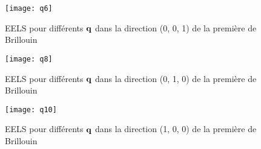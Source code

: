\begin{figure}[!h]\label{fig-q6}
    \centering
    \texttt{[image: q6]}
    \caption{EELS pour différents $\vb{q}$ dans la direction (0, 0, 1) de la première de Brillouin}
\end{figure}

\begin{figure}[!h]\label{fig-q8}
    \centering
    \texttt{[image: q8]}
    \caption{EELS pour différents $\vb{q}$ dans la direction (0, 1, 0) de la première de Brillouin}
\end{figure}
\begin{figure}[!h]\label{fig-q10}
    \centering
    \texttt{[image: q10]}
    \caption{EELS pour différents $\vb{q}$ dans la direction (1, 0, 0) de la première de Brillouin}
\end{figure}
